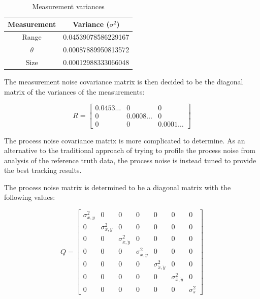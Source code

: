 \documentclass[12pt]{article}
\begin{document}
\begin{table}[H]
    \centering
    \caption{Measurement variances}
    \label{tab:p1-meas-noise}
    \begin{tabular}{|c|c|}
        \hline
        \textbf{Measurement} & \textbf{Variance} ($\sigma^2$) \\
        \hline
        Range &    0.04539078586229167 \\
        \hline
        $\theta$ & 0.00087889950813572 \\
        \hline
        Size &     0.00012988333066048 \\
        \hline
    \end{tabular}
\end{table}

The measurement noise covariance matrix is then decided to be the diagonal matrix of the variances of the measurements:

\begin{equation}
    \label{eqn:p1-meas-noise-cov}
    R = \begin{bmatrix}
        0.0453\dots & 0 & 0 \\
        0 & 0.0008\dots & 0 \\
        0 & 0 & 0.0001\dots
    \end{bmatrix}
\end{equation}

The process noise covariance matrix is more complicated to determine. As an alternative to the traditional approach of trying to profile the process noise from analysis of the reference truth data, the process noise is instead tuned to provide the best tracking results.

The process noise matrix is determined to be a diagonal matrix with the following values:

\begin{equation}
    \label{eqn:p1-proc-noise-cov}
    Q = \begin{bmatrix}
        \sigma^2_{x,y} & 0 & 0 & 0 & 0 & 0 & 0 \\
        0 & \sigma^2_{x,y} & 0 & 0 & 0 & 0 & 0 \\
        0 & 0 & \sigma^2_{\dot{x},\dot{y}} & 0 & 0 & 0 & 0 \\
        0 & 0 & 0 & \sigma^2_{\dot{x},\dot{y}} & 0 & 0 & 0 \\
        0 & 0 & 0 & 0 & \sigma^2_{\ddot{x},\ddot{y}} & 0 & 0 \\
        0 & 0 & 0 & 0 & 0 & \sigma^2_{\ddot{x},\ddot{y}} & 0 \\
        0 & 0 & 0 & 0 & 0 & 0 & \sigma^2_{s}
    \end{bmatrix}
\end{equation}
\end{document}
